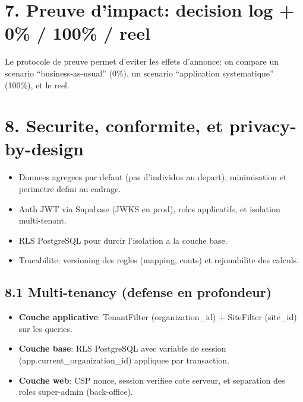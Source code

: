 \documentclass[11pt,a4paper]{article}
\begin{document}
\section*{7. Preuve d'impact: decision log + 0\% / 100\% / reel}
\begin{center}
\end{center}
Le protocole de preuve permet d'eviter les effets d'annonce: on compare un scenario ``business-as-usual'' (0\%), un scenario ``application systematique'' (100\%), et le reel.

\section*{8. Securite, conformite, et privacy-by-design}
\begin{itemize}
  \item Donnees agregees par defaut (pas d'individus au depart), minimisation et perimetre defini au cadrage.
  \item Auth JWT via Supabase (JWKS en prod), roles applicatifs, et isolation multi-tenant.
  \item RLS PostgreSQL pour durcir l'isolation a la couche base.
  \item Tracabilite: versioning des regles (mapping, couts) et rejouabilite des calculs.
\end{itemize}

\subsection*{8.1 Multi-tenancy (defense en profondeur)}
\begin{itemize}
  \item \textbf{Couche applicative}: TenantFilter (organization\_id) + SiteFilter (site\_id) sur les queries.
  \item \textbf{Couche base}: RLS PostgreSQL avec variable de session (app.current\_organization\_id) appliquee par transaction.
  \item \textbf{Couche web}: CSP nonce, session verifiee cote serveur, et separation des roles super-admin (back-office).
\end{itemize}
\end{document}
